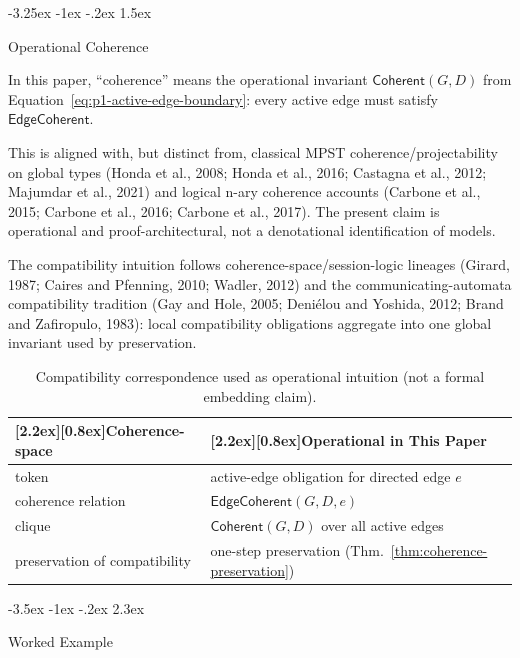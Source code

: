 \documentclass[a4paper,10pt,twocolumn,english]{article}
\makeatletter
\renewcommand{\section}{\@startsection{section}{1}{\z@}%
  {-3.5ex \@plus -1ex \@minus -.2ex}%
  {2.3ex}%
  {\raggedright\normalfont\large\bfseries}}
\renewcommand{\subsection}{\@startsection{subsection}{2}{\z@}%
  {-3.25ex \@plus -1ex \@minus -.2ex}%
  {1.5ex}%
  {\raggedright\normalfont\normalsize\bfseries}}
\numberwithin{equation}{section}
\theoremstyle{paperdef}
\theoremstyle{paperplain}
\theoremstyle{paperdef}
\theoremstyle{paperremark}
\newcommand{\thead}[1]{\textbf{\raisebox{0pt}[2.2ex][0.8ex]{#1}}}
\newcommand{\Coherent}{\ensuremath{\mathsf{Coherent}}}
\newcommand{\EdgeCoherent}{\ensuremath{\mathsf{EdgeCoherent}}}
\makeatother
\begin{document}
\subsection{Operational Coherence}

In this paper, ``coherence'' means the operational invariant
$\Coherent(G,D)$ from Equation~\ref{eq:p1-active-edge-boundary}: every active edge must satisfy
$\EdgeCoherent$.

This is aligned with, but distinct from, classical MPST coherence/projectability on global types
(Honda et al., 2008; Honda et al., 2016; Castagna et al., 2012; Majumdar et al., 2021) and logical
n-ary coherence accounts (Carbone et al., 2015; Carbone et al., 2016; Carbone et al., 2017).
The present claim is operational and proof-architectural, not a denotational identification of models.

The compatibility intuition follows coherence-space/session-logic lineages (Girard, 1987; Caires and
Pfenning, 2010; Wadler, 2012) and the communicating-automata compatibility tradition
(Gay and Hole, 2005; Deni\'{e}lou and Yoshida, 2012; Brand and Zafiropulo, 1983): local compatibility
obligations aggregate into one global invariant used by preservation.

\begin{table}[H]
	\centering
	\footnotesize
	\begin{tabularx}{\columnwidth}{@{}L{0.34\columnwidth}L{0.54\columnwidth}@{}}
		\toprule
		\thead{Coherence-space}       & \thead{Operational in This Paper}                             \\
		\midrule
		token                         & active-edge obligation for directed edge $e$                  \\
		coherence relation            & $\EdgeCoherent(G,D,e)$                                        \\
		clique                        & $\Coherent(G,D)$ over all active edges                        \\
		preservation of compatibility & one-step preservation (Thm.~\ref{thm:coherence-preservation}) \\
		\bottomrule
	\end{tabularx}
	\caption{Compatibility correspondence used as operational intuition (not a formal embedding claim).}
\end{table}

\section{Worked Example}
\label{sec:example}
\end{document}

